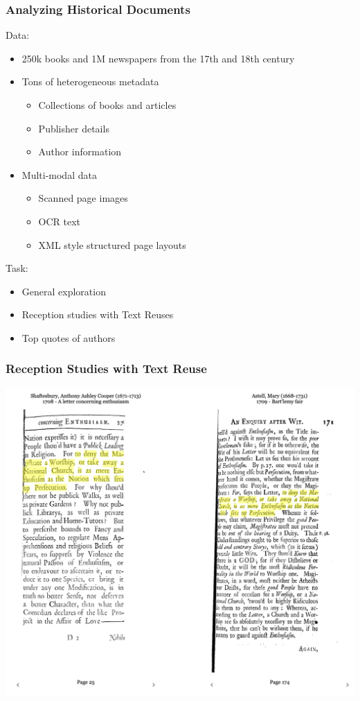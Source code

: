\documentclass[pdf]{beamer}
\begin{document}
\begin{frame}
    \frametitle{Analyzing Historical Documents}
    Data:
    \begin{itemize}
        \item 250k books and 1M newspapers from the 17th and 18th century
        \item Tons of heterogeneous metadata
        \begin{itemize}
            \item Collections of books and articles
            \item Publisher details
            \item Author information
        \end{itemize}
        \item Multi-modal data  
        \begin{itemize}
            \item Scanned page images
            \item OCR text
            \item XML style structured page layouts
        \end{itemize}
    \end{itemize}
    Task:
    \begin{itemize}
        \item General exploration
        \item Reception studies with Text Reuses   
        \item Top quotes of authors
    \end{itemize}
\end{frame}

\begin{frame}
    \frametitle{Reception Studies with Text Reuse}
    \includegraphics[width=\textwidth]{figs/Reception-Reader-Example.png}


\end{frame}
\end{document}
